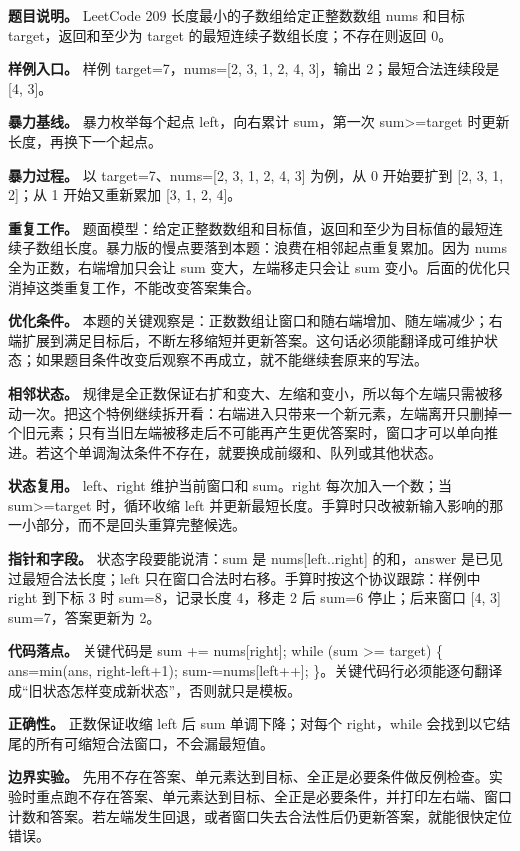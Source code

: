 \textbf{题目说明。} LeetCode 209 长度最小的子数组给定正整数数组 nums 和目标 target，返回和至少为 target 的最短连续子数组长度；不存在则返回 0。

\textbf{样例入口。} 样例 target=7，nums=[2, 3, 1, 2, 4, 3]，输出 2；最短合法连续段是 [4, 3]。

\textbf{暴力基线。} 暴力枚举每个起点 left，向右累计 sum，第一次 sum>=target 时更新长度，再换下一个起点。

\textbf{暴力过程。} 以 target=7、nums=[2, 3, 1, 2, 4, 3] 为例，从 0 开始要扩到 [2, 3, 1, 2]；从 1 开始又重新累加 [3, 1, 2, 4]。

\textbf{重复工作。} 题面模型：给定正整数数组和目标值，返回和至少为目标值的最短连续子数组长度。暴力版的慢点要落到本题：浪费在相邻起点重复累加。因为 nums 全为正数，右端增加只会让 sum 变大，左端移走只会让 sum 变小。后面的优化只消掉这类重复工作，不能改变答案集合。

\textbf{优化条件。} 本题的关键观察是：正数数组让窗口和随右端增加、随左端减少；右端扩展到满足目标后，不断左移缩短并更新答案。这句话必须能翻译成可维护状态；如果题目条件改变后观察不再成立，就不能继续套原来的写法。

\textbf{相邻状态。} 规律是全正数保证右扩和变大、左缩和变小，所以每个左端只需被移动一次。把这个特例继续拆开看：右端进入只带来一个新元素，左端离开只删掉一个旧元素；只有当旧左端被移走后不可能再产生更优答案时，窗口才可以单向推进。若这个单调淘汰条件不存在，就要换成前缀和、队列或其他状态。

\textbf{状态复用。} left、right 维护当前窗口和 sum。right 每次加入一个数；当 sum>=target 时，循环收缩 left 并更新最短长度。手算时只改被新输入影响的那一小部分，而不是回头重算完整候选。

\textbf{指针和字段。} 状态字段要能说清：sum 是 nums[left..right] 的和，answer 是已见过最短合法长度；left 只在窗口合法时右移。手算时按这个协议跟踪：样例中 right 到下标 3 时 sum=8，记录长度 4，移走 2 后 sum=6 停止；后来窗口 [4, 3] sum=7，答案更新为 2。

\textbf{代码落点。} 关键代码是 sum += nums[right]; while (sum >= target) \{ ans=min(ans, right-left+1); sum-=nums[left++]; \}。关键代码行必须能逐句翻译成“旧状态怎样变成新状态”，否则就只是模板。

\textbf{正确性。} 正数保证收缩 left 后 sum 单调下降；对每个 right，while 会找到以它结尾的所有可缩短合法窗口，不会漏最短值。

\textbf{边界实验。} 先用不存在答案、单元素达到目标、全正是必要条件做反例检查。实验时重点跑不存在答案、单元素达到目标、全正是必要条件，并打印左右端、窗口计数和答案。若左端发生回退，或者窗口失去合法性后仍更新答案，就能很快定位错误。

